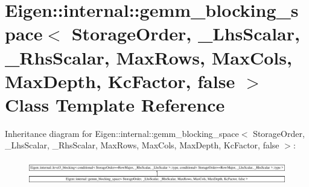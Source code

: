 \hypertarget{class_eigen_1_1internal_1_1gemm__blocking__space_3_01_storage_order_00_01___lhs_scalar_00_01___rbcde58016e0f2e47700c92659db0c8a7}{}\section{Eigen\+::internal\+::gemm\+\_\+blocking\+\_\+space$<$ Storage\+Order, \+\_\+\+Lhs\+Scalar, \+\_\+\+Rhs\+Scalar, Max\+Rows, Max\+Cols, Max\+Depth, Kc\+Factor, false $>$ Class Template Reference}
\label{class_eigen_1_1internal_1_1gemm__blocking__space_3_01_storage_order_00_01___lhs_scalar_00_01___rbcde58016e0f2e47700c92659db0c8a7}
Inheritance diagram for Eigen\+::internal\+::gemm\+\_\+blocking\+\_\+space$<$ Storage\+Order, \+\_\+\+Lhs\+Scalar, \+\_\+\+Rhs\+Scalar, Max\+Rows, Max\+Cols, Max\+Depth, Kc\+Factor, false $>$\+:\begin{figure}[H]
\begin{center}
\leavevmode
\includegraphics[height=1.067683cm]{class_eigen_1_1internal_1_1gemm__blocking__space_3_01_storage_order_00_01___lhs_scalar_00_01___rbcde58016e0f2e47700c92659db0c8a7}
\end{center}
\end{figure}
